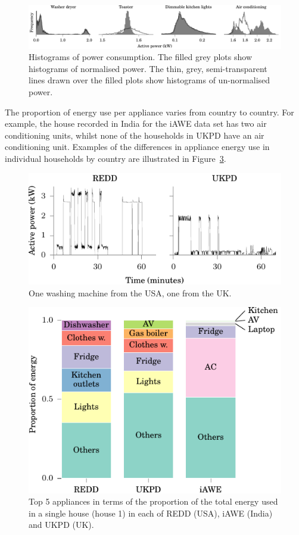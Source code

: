 \documentclass{sig-alternate}
\begin{document}
\begin{figure}[!t]
  \centering
  \includegraphics{figures/power_histograms.pdf} 
  \caption{Histograms of power consumption. The filled grey plots show
    histograms of normalised power.  The thin, grey,
    semi-transparent lines drawn over the filled plots show histograms
    of un-normalised power.}
  \label{fig:power_histograms} 
\end{figure}

The proportion of energy use per appliance varies from country to
country. For example, the house recorded in India for the iAWE
data set has two air conditioning units, whilst none of the households
in UKPD have an air conditioning unit.  Examples of the differences in appliance
energy use in individual households by country are illustrated in Figure~\ref{fig:pie}.

\begin{figure}
  \centering
  \includegraphics[width=\columnwidth]{figures/wm.pdf}
  \caption{One washing machine from the USA, one from the UK.}
  \label{fig:wm}
\end{figure} 

\begin{figure}
 \centering
 \includegraphics[width=\columnwidth]{figures/top_k_appliances_bar.pdf}
 \caption{Top 5 appliances in terms of the proportion of the total
   energy used in a single house (house 1) in each of REDD (USA), iAWE (India) and
   UKPD (UK).}
 \label{fig:pie}
\end{figure}
\end{document}
